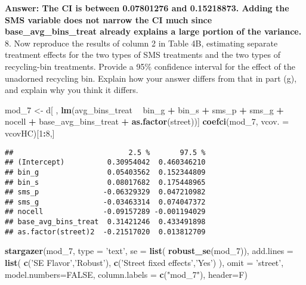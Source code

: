 \documentclass[
]{article}
\newenvironment{Shaded}{\begin{snugshade}}{\end{snugshade}}
\newcommand{\DataTypeTok}[1]{\textcolor[rgb]{0.13,0.29,0.53}{#1}}
\newcommand{\DecValTok}[1]{\textcolor[rgb]{0.00,0.00,0.81}{#1}}
\newcommand{\KeywordTok}[1]{\textcolor[rgb]{0.13,0.29,0.53}{\textbf{#1}}}
\newcommand{\NormalTok}[1]{#1}
\newcommand{\OperatorTok}[1]{\textcolor[rgb]{0.81,0.36,0.00}{\textbf{#1}}}
\newcommand{\OtherTok}[1]{\textcolor[rgb]{0.56,0.35,0.01}{#1}}
\newcommand{\StringTok}[1]{\textcolor[rgb]{0.31,0.60,0.02}{#1}}
\begin{document}
\textbf{Answer: The CI is between 0.07801276 and 0.15218873. Adding the
SMS variable does not narrow the CI much since base\_avg\_bins\_treat
already explains a large portion of the variance.} 8. Now reproduce the
results of column 2 in Table 4B, estimating separate treatment effects
for the two types of SMS treatments and the two types of recycling-bin
treatments. Provide a 95\% confidence interval for the effect of the
unadorned recycling bin. Explain how your answer differs from that in
part (g), and explain why you think it differs.

\begin{Shaded}
\begin{Highlighting}[]
\NormalTok{mod_}\DecValTok{7}\NormalTok{ <-}\StringTok{ }\NormalTok{d[ , }\KeywordTok{lm}\NormalTok{(avg_bins_treat }\OperatorTok{~}\StringTok{ }\NormalTok{bin_g }\OperatorTok{+}\StringTok{ }\NormalTok{bin_s }\OperatorTok{+}\StringTok{ }\NormalTok{sms_p }\OperatorTok{+}\StringTok{ }\NormalTok{sms_g }\OperatorTok{+}\StringTok{ }\NormalTok{nocell }\OperatorTok{+}\StringTok{ }\NormalTok{base_avg_bins_treat }\OperatorTok{+}\StringTok{ }\KeywordTok{as.factor}\NormalTok{(street))]}
\KeywordTok{coefci}\NormalTok{(mod_}\DecValTok{7}\NormalTok{, }\DataTypeTok{vcov. =}\NormalTok{ vcovHC)[}\DecValTok{1}\OperatorTok{:}\DecValTok{8}\NormalTok{,]}
\end{Highlighting}
\end{Shaded}

\begin{verbatim}
##                           2.5 %       97.5 %
## (Intercept)          0.30954042  0.460346210
## bin_g                0.05403562  0.152344809
## bin_s                0.08017682  0.175448965
## sms_p               -0.06329329  0.047210982
## sms_g               -0.03463314  0.074047372
## nocell              -0.09157289 -0.001194029
## base_avg_bins_treat  0.31421246  0.433491898
## as.factor(street)2  -0.21517020  0.013812709
\end{verbatim}

\begin{Shaded}
\begin{Highlighting}[]
\KeywordTok{stargazer}\NormalTok{(mod_}\DecValTok{7}\NormalTok{, }\DataTypeTok{type =} \StringTok{'text'}\NormalTok{, }\DataTypeTok{se =} \KeywordTok{list}\NormalTok{( }\KeywordTok{robust_se}\NormalTok{(mod_}\DecValTok{7}\NormalTok{)), }\DataTypeTok{add.lines =} \KeywordTok{list}\NormalTok{( }\KeywordTok{c}\NormalTok{(}\StringTok{'SE Flavor'}\NormalTok{,}\StringTok{'Robust'}\NormalTok{), }\KeywordTok{c}\NormalTok{(}\StringTok{'Street fixed effects'}\NormalTok{,}\StringTok{'Yes'}\NormalTok{) ), }\DataTypeTok{omit =} \StringTok{'street'}\NormalTok{, }\DataTypeTok{model.numbers=}\OtherTok{FALSE}\NormalTok{, }\DataTypeTok{column.labels =} \KeywordTok{c}\NormalTok{(}\StringTok{"mod_7"}\NormalTok{), }\DataTypeTok{header=}\NormalTok{F)}
\end{Highlighting}
\end{Shaded}
\end{document}
